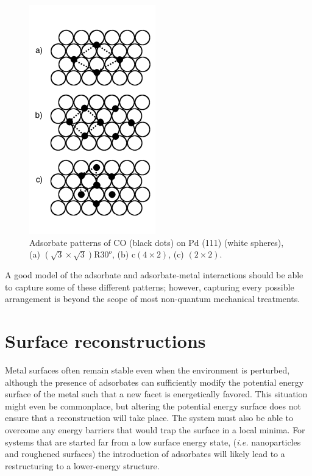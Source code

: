 \begin{figure}[p!]
\centering
  \includegraphics[width=0.5\linewidth]{../figures/chap1/pattern.pdf}
  \caption{Adsorbate patterns of CO (black dots) on Pd (111) (white spheres), (a)
$(\sqrt{3}\times\sqrt{3})\textrm{R}30^o$, (b) c$(4\times2)$, (c) $(2\times2)$.}
\label{fig:patterns}
\end{figure}

A good model of the adsorbate and adsorbate-metal interactions should be able
to capture some of these different patterns; however, capturing every possible
arrangement is beyond the scope of most non-quantum mechanical treatments.

\section{Surface reconstructions}

Metal surfaces often remain stable even when the environment is perturbed,
although the presence of adsorbates can sufficiently modify the potential
energy surface of the metal such that a new facet is energetically favored.
This situation might even be commonplace, but altering the potential energy
surface does not ensure that a reconstruction will take place. The system must
also be able to overcome any energy barriers that would trap the surface in a
local minima.  For systems that are started far from a low surface energy
state, ({\em i.e.} nanoparticles and roughened surfaces) the introduction of
adsorbates will likely lead to a restructuring to a lower-energy structure. 

